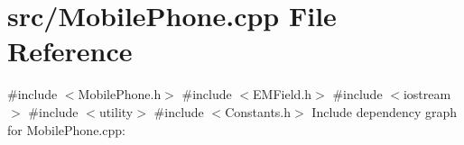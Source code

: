 \section{src/\+Mobile\+Phone.cpp File Reference}
\label{_mobile_phone_8cpp}
{\ttfamily \#include $<$Mobile\+Phone.\+h$>$}\newline
{\ttfamily \#include $<$E\+M\+Field.\+h$>$}\newline
{\ttfamily \#include $<$iostream$>$}\newline
{\ttfamily \#include $<$utility$>$}\newline
{\ttfamily \#include $<$Constants.\+h$>$}\newline
Include dependency graph for Mobile\+Phone.\+cpp\+:
